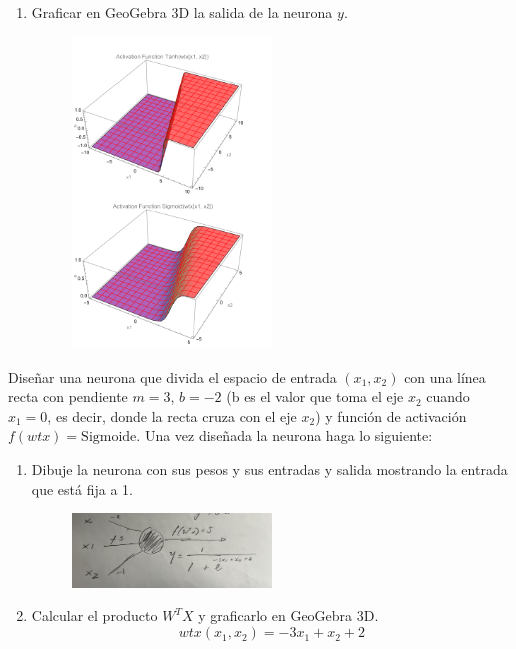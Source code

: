 \documentclass{article}
\begin{document}
\begin{flushleft}
\begin{enumerate}
\begin{figure}[H]
\end{figure}
\newpage
\item Graficar en GeoGebra 3D la salida de la neurona $y$.
\begin{figure}[H]
  \centering
  \includegraphics[width=0.5\textwidth]{1d.png}  %
\end{figure}
\end{enumerate}
Diseñar una neurona que divida el espacio de entrada $(x_1, x_2)$ con una línea recta con pendiente
$m=3$, $b=-2$ (b es el valor que toma el eje $x_2$ cuando $x_1=0$, es decir, donde la recta cruza con el eje
$x_2$) y función de activación $f(wtx)=\text{Sigmoide}$. Una vez diseñada la neurona haga lo siguiente:
\begin{enumerate}
  \item Dibuje la neurona con sus pesos y sus entradas y salida mostrando la entrada que está fija a 1.
  \begin{figure}[H]
    \centering
    \includegraphics[width=0.5\textwidth]{sigmoide.jpg}  %
  \end{figure}
  \item Calcular el producto $W^T X$ y graficarlo en GeoGebra 3D.
  \[ wtx(x_1, x_2) = -3 x_1 + x_2 + 2 \]

\end{enumerate}
\end{flushleft}
\end{document}
